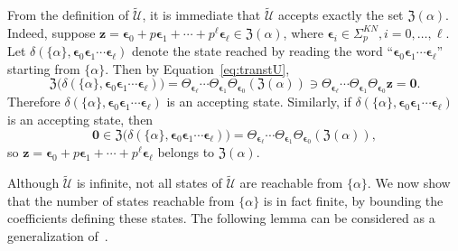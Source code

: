 \documentclass[letterpaper, 11pt, thm-restate]{article}
\numberwithin{equation}{section}
\newcommand{\mZ}{\mathfrak{Z}}
\newcommand{\bepsilon}{\boldsymbol{\epsilon}}
\newcommand{\tU}{\widetilde{\mathscr{U}}}
\newcommand{\bz}{\boldsymbol{z}}
\newcommand{\bzer}{\boldsymbol{0}}
\theoremstyle{definition}
\theoremstyle{definition}
\theoremstyle{definition}
\begin{document}
From the definition of $\tU$, it is immediate that $\tU$ accepts exactly the set $\mZ(\alpha)$.
Indeed, suppose $\bz = \bepsilon_0 + p \bepsilon_1 + \cdots + p^{\ell} \bepsilon_{\ell} \in \mZ(\alpha)$, where $\bepsilon_{i} \in \Sigma_p^{KN}, i = 0, \ldots, \ell$.
Let $\delta\left(\{\alpha\}, \bepsilon_0\bepsilon_1\cdots\bepsilon_{\ell}\right)$ denote the state reached by reading the word ``$\bepsilon_0\bepsilon_1\cdots\bepsilon_{\ell}$'' starting from $\{\alpha\}$.
Then by Equation~\eqref{eq:transtU},
\[
\mZ\big(\delta\left(\{\alpha\}, \bepsilon_0\bepsilon_1\cdots\bepsilon_{\ell}\right)\big) = \Theta_{\bepsilon_{\ell}} \cdots \Theta_{\bepsilon_1}\Theta_{\bepsilon_0}\left(\mZ(\alpha)\right) \ni \Theta_{\bepsilon_{\ell}} \cdots \Theta_{\bepsilon_1}\Theta_{\bepsilon_0}\bz = \bzer.
\]
Therefore $\delta\left(\{\alpha\}, \bepsilon_0\bepsilon_1\cdots\bepsilon_{\ell}\right)$ is an accepting state.
Similarly, if $\delta\left(\{\alpha\}, \bepsilon_0\bepsilon_1\cdots\bepsilon_{\ell}\right)$ is an accepting state, then
\[
\bzer \in \mZ\big(\delta\left(\{\alpha\}, \bepsilon_0\bepsilon_1\cdots\bepsilon_{\ell}\right)\big) = \Theta_{\bepsilon_{\ell}} \cdots \Theta_{\bepsilon_1}\Theta_{\bepsilon_0}\left(\mZ(\alpha)\right),
\]
so $\bz = \bepsilon_0 + p \bepsilon_1 + \cdots + p^{\ell} \bepsilon_{\ell}$ belongs to $\mZ(\alpha)$.

Although $\tU$ is infinite, not all states of $\tU$ are reachable from $\{\alpha\}$.
We now show that the number of states reachable from $\{\alpha\}$ is in fact finite, by bounding the coefficients defining these states.
The following lemma can be considered as a generalization of~\cite[Proposition~5.2]{derksen2007skolem}.
\end{document}
